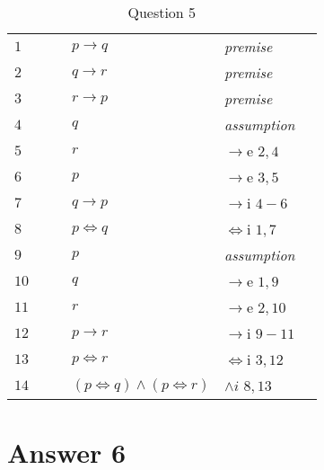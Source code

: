 \documentclass[12pt]{article}
\begin{document}
\begin{table}[H]
	\centering
	\caption{Question 5}
	\begin{tabular}{*6{l}}
		\cline{2-6}
		\cline{2-6}
		$1$ & & & $p \rightarrow q$ & \textit{premise}  \\ 
		
		$2$ & & & $q \rightarrow r$ & \textit{premise} & \\ 
				
		$3$ & & & $r \rightarrow p$ & \textit{premise} & \\ \cline{2-6}
		
		$4$ &\multicolumn{1}{|c}{} & & $q$ &\textit{assumption} &\multicolumn{1}{c|}{}\\ 
		 
		$5$ &\multicolumn{1}{|c}{}& & $r$ & $\rightarrow$e $2,4$ &\multicolumn{1}{c|}{}\\ 
		
		$6$ &\multicolumn{1}{|c}{}& & $p$ &$\rightarrow$e $3,5$ &\multicolumn{1}{c|}{}\\ \cline{2-6}
		
		$7$ & & & $q \rightarrow p$ & $\rightarrow$i $4-6$ &\\ 
		
		$8$ & & & $p \iff q$ & $\iff$i $1,7$ &\\ \cline{2-6}
		
		$9$ &\multicolumn{1}{|c}{} & & $p$ &\textit{assumption} &\multicolumn{1}{c|}{}\\ 
		 
		$10$ &\multicolumn{1}{|c}{}& & $q$ &$\rightarrow$e $1,9$&\multicolumn{1}{c|}{}\\ 
		
		$11$ &\multicolumn{1}{|c}{}& & $r$ &$\rightarrow$e $2,10$&\multicolumn{1}{c|}{}\\ \cline{2-6}
		
		$12$ & & & $p \rightarrow r$ & $\rightarrow$i $9-11$ &\\ 

		$13$ & & & $p \iff r$ &$\iff$i $3,12$ &\\ 

		$14$ & & & $(p \iff q) \land (p \iff r)$ & $ \land i$ $8,13$ &\\ 

	

	\end{tabular}
\end{table}
		
	
\section*{Answer 6}
\end{document}
